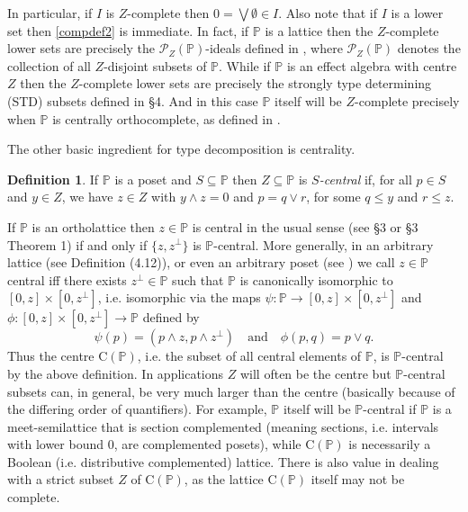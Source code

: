 \documentclass{amsart}
\theoremstyle{definition}
\newtheorem{dfn}[dfn]{Definition}
\numberwithin{equation}{section}
\begin{document}
In particular, if $I$ is $Z$-complete then $0=\bigvee\emptyset\in I$.  Also note that if $I$ is a lower set then \eqref{compdef2} is immediate.  In fact, if $\mathbb{P}$ is a lattice then the $Z$-complete lower sets are precisely the $\mathscr{P}_Z(\mathbb{P})$-ideals defined in \cite{Niederle2006}, where $\mathscr{P}_Z(\mathbb{P})$ denotes the collection of all $Z$-disjoint subsets of $\mathbb{P}$.  While if $\mathbb{P}$ is an effect algebra with centre $Z$ then the $Z$-complete lower sets are precisely the strongly type determining (STD) subsets defined in \cite{FoulisPulmannova2010} \S4.  And in this case $\mathbb{P}$ itself will be $Z$-complete precisely when $\mathbb{P}$ is centrally orthocomplete, as defined in \cite{FoulisPulmannova2010b}.

The other basic ingredient for type decomposition is centrality.

\begin{dfn}
If $\mathbb{P}$ is a poset and $S\subseteq\mathbb{P}$ then $Z\subseteq\mathbb{P}$ is \emph{$S$-central} if, for all $p\in S$ and $y\in Z$, we have $z\in Z$ with $y\wedge z=0$ and $p=q\vee r$, for some $q\leq y$ and $r\leq z$.
\end{dfn}

If $\mathbb{P}$ is an ortholattice then $z\in\mathbb{P}$ is central in the usual sense (see \cite{MacLaren1964} \S3 or \cite{Kalmbach1983} \S3 Theorem 1) if and only if $\{z,z^\perp\}$ is $\mathbb{P}$-central.  More generally, in an arbitrary lattice (see \cite{MaedaMaeda1970} Definition (4.12)), or even an arbitrary poset (see \cite{GudderHaskins1974}) we call $z\in\mathbb{P}$ central iff there exists $z^\perp\in\mathbb{P}$ such that $\mathbb{P}$ is canonically isomorphic to $[0,z]\times[0,z^\perp]$, i.e. isomorphic via the maps $\psi:\mathbb{P}\rightarrow[0,z]\times[0,z^\perp]$ and $\phi:[0,z]\times[0,z^\perp]\rightarrow\mathbb{P}$ defined by
\begin{equation}\label{centralmaps}
\psi(p)=(p\wedge z,p\wedge z^\perp)\quad\textrm{and}\quad\phi(p,q)=p\vee q.
\end{equation}
Thus the centre $\mathrm{C}(\mathbb{P})$, i.e. the subset of all central elements of $\mathbb{P}$, is $\mathbb{P}$-central by the above definition.  In applications $Z$ will often be the centre but $\mathbb{P}$-central subsets can, in general, be very much larger than the centre (basically because of the differing order of quantifiers).  For example, $\mathbb{P}$ itself will be $\mathbb{P}$-central if $\mathbb{P}$ is a meet-semilattice that is section complemented (meaning sections, i.e. intervals with lower bound $0$, are complemented posets), while $\mathrm{C}(\mathbb{P})$ is necessarily a Boolean (i.e. distributive complemented) lattice.  There is also value in dealing with a strict subset $Z$ of $\mathrm{C}(\mathbb{P})$, as the lattice $\mathrm{C}(\mathbb{P})$ itself may not be complete.
\end{document}
